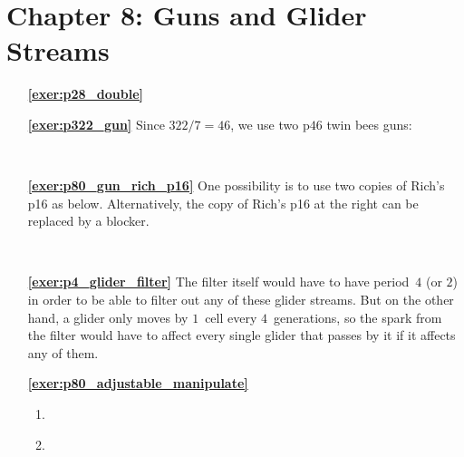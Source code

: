 \section*{Chapter 8: Guns and Glider Streams}
\renewcommand{\chapterfolder}{glider_guns/}

\begin{multicols}{2}
	\begin{itemize}[leftmargin=0em]
		\item[\bf\color{ocre}\sffamily\ref{exer:p28_double}] \\
		
		
		\item[\bf\color{ocre}\sffamily\ref{exer:p322_gun}] Since $322/7 = 46$, we use two p$46$ twin bees guns:
		\begin{center}
			\\
		\end{center}
		
		
		\item[\bf\color{ocre}\sffamily\ref{exer:p80_gun_rich_p16}] One possibility is to use two copies of Rich's p16 as below. Alternatively, the copy of Rich's p16 at the right can be replaced by a blocker.
		\begin{center}
			\\
		\end{center}
		
		
		\item[\bf\color{ocre}\sffamily\ref{exer:p4_glider_filter}] The filter itself would have to have period~$4$ (or $2$) in order to be able to filter out any of these glider streams. But on the other hand, a glider only moves by $1$~cell every $4$~generations, so the spark from the filter would have to affect every single glider that passes by it if it affects any of them.\\
		
		
		\item[\bf\color{ocre}\sffamily\ref{exer:p80_adjustable_manipulate}] \begin{enumerate}[leftmargin=1.5em,label=\bf\color{ocre}(\alph*)]
			\item {} \\
			
			\item {} \\
			

\end{enumerate}
\end{itemize}
\end{multicols}
